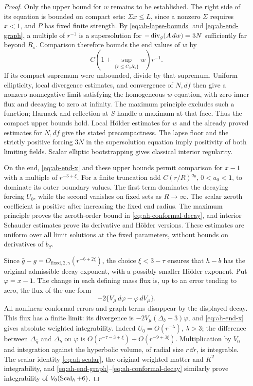 \begin{proof}
Only the upper bound for \(w\) remains to be established.
The right side of its equation is bounded on compact sets:
\(\Sigma x\le L\), since a nonzero \(\Sigma\) requires \(x<1\),
and \(P\) has fixed finite strength.
By \eqref{eq:ah-lapse-bounds} and \eqref{eq:ah-end-graph},
a multiple of \(r^{-1}\) is a supersolution for
\(-\operatorname{div}_g(A\,dw)=3N\) sufficiently far beyond \(R_s\).
Comparison therefore bounds the end values of \(w\) by
\[
 C\left(1+\sup_{\{r\le C_0R_s\}}w\right)r^{-1}.
\]
If its compact supremum were unbounded, divide by that
supremum.  Uniform ellipticity, local divergence estimates,
and convergence of \(N,df\) then give a nonzero nonnegative
limit satisfying the homogeneous \(w\)-equation, with zero
inner flux and decaying to zero at infinity.  The maximum
principle excludes such a function; Harnack and reflection
at \(S\) handle a maximum at that face.  Thus the compact
upper bounds hold.  Local Hölder estimates for \(w\) and
the already proved estimates for \(N,df\) give the stated
precompactness.  The lapse floor and the strictly positive
forcing \(3N\) in the supersolution equation imply positivity
of both limiting fields.  Scalar elliptic bootstrapping gives
classical interior regularity.

On the end, \eqref{eq:ah-end-x} and these upper bounds permit
comparison for \(x-1\) with a multiple of \(r^{-3+\xi}\).
For a finite truncation add \(C(r/R)^{a_0}\), \(0<a_0<1\),
to dominate its outer boundary values.  The first term
dominates the decaying forcing \(U_0\), while the second
vanishes on fixed sets as \(R\to\infty\).
The scalar zeroth coefficient is positive after increasing
the fixed end radius.  The maximum principle proves the
zeroth-order bound in \eqref{eq:ah-conformal-decay}, and
interior Schauder estimates prove its derivative and Hölder
versions.  These estimates are uniform over all limit
solutions at the fixed parameters, without bounds on
derivatives of \(b_S\).

Since
\(\bar g-g=O_{\mathrm{fixed},2,\gamma}(r^{-6+2\xi})\),
the choice \(\xi<3-\tau\) ensures that \(h-b\) has the
original admissible decay exponent, with a possibly smaller
Hölder exponent.  Put \(\varphi=x-1\).
The change in each defining mass flux is, up to an error
tending to zero, the flux of the one-form
\[
 -2\{V_\mu\,d\varphi-\varphi\,dV_\mu\}.
\]
All nonlinear conformal errors and graph terms disappear
by the displayed decay.  This flux has a finite limit:
its divergence is
\(-2V_\mu(\Delta_b-3)\varphi\), and
\eqref{eq:ah-end-x} gives absolute weighted integrability.
Indeed \(U_0=O(r^{-\lambda})\), \(\lambda>3\);
the difference between \(\Delta_{\bar g}\) and \(\Delta_b\)
on \(\varphi\) is
\(O(r^{-\tau-3+\xi})+O(r^{-9+3\xi})\).
Multiplication by \(V_0\) and integration against the
hyperbolic volume, of radial size \(r\,\dd r\), is integrable.
The scalar identity \eqref{eq:ah-scalar}, the original
weighted matter and \(K^2\) integrability, and
\eqref{eq:ah-end-graph}--\eqref{eq:ah-conformal-decay}
similarly prove integrability of \(V_0(\operatorname{Scal}_h+6)\).


\end{proof}

